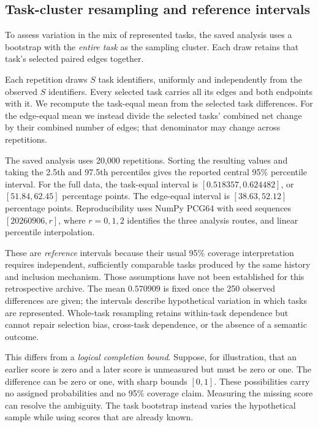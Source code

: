 \subsection{Task-cluster resampling and reference intervals}
\label{subsec:cluster-resampling}
To assess variation in the mix of represented tasks, the saved analysis uses a bootstrap with the \emph{entire task} as the sampling cluster\cite{scipybootstrap}. Each draw retains that task's selected paired edges together.

Each repetition draws $S$ task identifiers, uniformly and independently from the observed $S$ identifiers. Every selected task carries all its edges and both endpoints with it. We recompute the task-equal mean from the selected task differences. For the edge-equal mean we instead divide the selected tasks' combined net change by their combined number of edges; that denominator may change across repetitions.

The saved analysis uses 20,000 repetitions. Sorting the resulting values and taking the 2.5th and 97.5th percentiles gives the reported central 95\% percentile interval. For the full data, the task-equal interval is $[0.518357,0.624482]$, or $[51.84,62.45]$ percentage points. The edge-equal interval is $[38.63,52.12]$ percentage points. Reproducibility uses NumPy PCG64 with seed sequences $[20260906,r]$, where $r=0,1,2$ identifies the three analysis routes, and linear percentile interpolation.

These are \emph{reference} intervals because their usual 95\% coverage interpretation requires independent, sufficiently comparable tasks produced by the same history and inclusion mechanism. Those assumptions have not been established for this retrospective archive. The mean $0.570909$ is fixed once the 250 observed differences are given; the intervals describe hypothetical variation in which tasks are represented. Whole-task resampling retains within-task dependence but cannot repair selection bias, cross-task dependence, or the absence of a semantic outcome.

This differs from a \emph{logical completion bound}. Suppose, for illustration, that an earlier score is zero and a later score is unmeasured but must be zero or one. The difference can be zero or one, with sharp bounds $[0,1]$. These possibilities carry no assigned probabilities and no 95\% coverage claim. Measuring the missing score can resolve the ambiguity. The task bootstrap instead varies the hypothetical sample while using scores that are already known.

